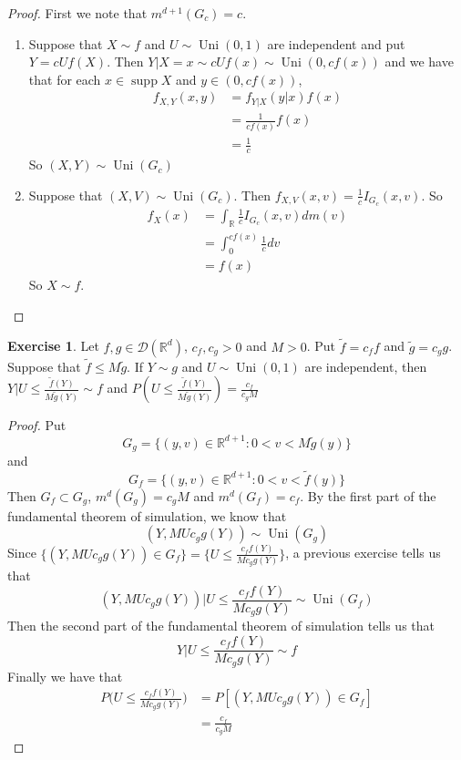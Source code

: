 \documentclass[12pt]{amsart}
\theoremstyle{definition}
\newtheorem{ex}[definition]{Exercise}
\newcommand{\R}{\mathbb{R}}
\newcommand{\MD}{\mathcal{D}}
\DeclareMathOperator{\supp}{supp}
\DeclareMathOperator{\uni}{Uni}
\begin{document}
	\begin{proof} First we note that $m^{d+1}(G_c) = c$. 
		\begin{enumerate}
			\item Suppose that $X \sim f$ and $U \sim \uni(0,1)$ are independent and put $Y = cUf(X)$. Then $Y| X= x \sim cUf(x) \sim \uni(0, cf(x))$ and we have that for each $x \in \supp X$ and $y \in (0, cf(x))$,
			\begin{align*}
				f_{X, Y}(x,y) 
				&= f_{Y|X}(y| x) f(x) \\
				&= \frac{1}{c f(x)}f(x) \\
				&= \frac{1}{c}
			\end{align*}
			So $(X, Y) \sim \uni(G_c)$\\
			\item Suppose that $(X, V) \sim \uni(G_c)$. Then $f_{X,V}(x,v) = \frac{1}{c} I_{G_c}(x,v)$. So 
			\begin{align*}
				f_X(x) 
				&= \int_{\R} \frac{1}{c}I_{G_c}(x,v) dm(v) \\ 
				&= \int_{0}^{cf(x)} \frac{1}{c}dv \\
				&= f(x) 
			\end{align*}
			So $X \sim f$.
		\end{enumerate}
	\end{proof}

	\begin{ex}
		Let $f, g \in \MD(\R^d)$, $c_f,c_g>0$ and $M > 0$. Put $\tilde{f} = c_f f$ and $\tilde{g} = c_g g$. Suppose that $\tilde{f} \leq M \tilde{g}$. If $Y \sim g$ and $U \sim \uni(0,1)$ are independent, then $Y|U \leq \frac{\tilde{f}(Y)}{M\tilde{g}(Y)} \sim f$ and $P ( U \leq \frac{\tilde{f}(Y)}{M\tilde{g}(Y)} ) = \frac{c_f}{c_gM}$ 
	\end{ex}

	\begin{proof}
		Put $$G_g = \{(y,v) \in \R^{d+1}: 0< v < M\tilde{g}(y)\} $$ and $$ G_f = \{(y,v) \in \R^{d+1}: 0< v < \tilde{f}(y)\} $$ 
		Then $G_f \subset G_g$, $m^d(G_g) = c_gM$ and $m^d(G_f) =c_f$. By the first part of the fundamental theorem of simulation, we know that $$(Y, MUc_gg(Y)) \sim \uni(G_g)$$ 
		Since $\{(Y, MUc_gg(Y)) \in G_f \} = \{U \leq \frac{c_ff(Y)}{Mc_gg(Y)}\}$, a previous exercise tells us that $$(Y, MUc_gg(Y))|U \leq \frac{c_ff(Y)}{Mc_gg(Y)} \sim \uni(G_f)$$
		Then the second part of the fundamental theorem of simulation tells us that $$Y|U \leq \frac{c_ff(Y)}{Mc_gg(Y)} \sim f$$
		Finally we have that
		\begin{align*}
			P \bigg( U \leq \frac{c_ff(Y)}{Mc_gg(Y)} \bigg) 
			&= P [(Y, MUc_gg(Y)) \in G_f ]\\
			&= \frac{c_f}{c_gM}
		\end{align*}
	\end{proof}
\end{document}
